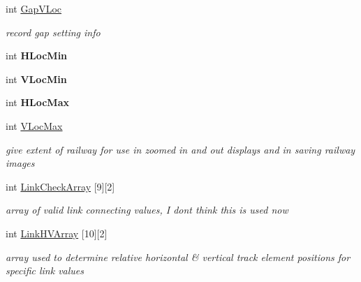 \begin{DoxyCompactItemize}
\mbox{\label{class_t_track_abb7e520a67eccc292c97444ff395d0c0}} 
int \mbox{\hyperlink{class_t_track_abb7e520a67eccc292c97444ff395d0c0}{Gap\+V\+Loc}}
\begin{DoxyCompactList}\small\item\em record gap setting info \end{DoxyCompactList}\item 
\mbox{\label{class_t_track_aa3a4180a4a3316a5d265964a6ba6b9f8}} 
int {\bfseries H\+Loc\+Min}
\item 
\mbox{\label{class_t_track_a906deb75070b0e29cf624569c982c23a}} 
int {\bfseries V\+Loc\+Min}
\item 
\mbox{\label{class_t_track_ab464ea55d7bf8c25d8d5863295209937}} 
int {\bfseries H\+Loc\+Max}
\item 
\mbox{\label{class_t_track_a847326710b5b428b1a8bb54b1d143c26}} 
int \mbox{\hyperlink{class_t_track_a847326710b5b428b1a8bb54b1d143c26}{V\+Loc\+Max}}
\begin{DoxyCompactList}\small\item\em give extent of railway for use in zoomed in and out displays and in saving railway images \end{DoxyCompactList}\item 
\mbox{\label{class_t_track_ae8df4625e0c05c1158f3fc366afe928c}} 
int \mbox{\hyperlink{class_t_track_ae8df4625e0c05c1158f3fc366afe928c}{Link\+Check\+Array}} \mbox{[}9\mbox{]}\mbox{[}2\mbox{]}
\begin{DoxyCompactList}\small\item\em array of valid link connecting values, I don\textquotesingle{}t think this is used now \end{DoxyCompactList}\item 
\mbox{\label{class_t_track_ab6f605b1cf52a3f8efba5549e19368a8}} 
int \mbox{\hyperlink{class_t_track_ab6f605b1cf52a3f8efba5549e19368a8}{Link\+H\+V\+Array}} \mbox{[}10\mbox{]}\mbox{[}2\mbox{]}
\begin{DoxyCompactList}\small\item\em array used to determine relative horizontal \& vertical track element positions for specific link values \end{DoxyCompactList}\item 

\end{DoxyCompactItemize}
